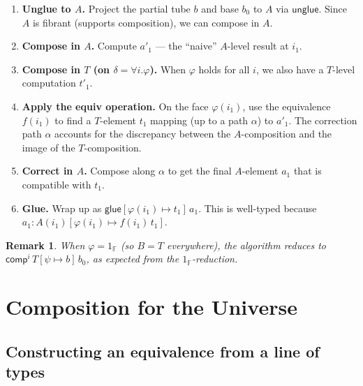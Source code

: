 \documentclass[11pt, a4paper]{article}
\newtheorem{remark}[theorem]{Remark}
\newcommand{\pt}[1]{\mathsf{#1}}
\newcommand{\glueT}{\pt{glue}}
\newcommand{\unglueT}{\pt{unglue}}
\newcommand{\compT}{\pt{comp}}
\newcommand{\sys}[2]{[#1 \mapsto #2]}
\newcommand{\ii}{i_1}
\newcommand{\topF}{1_{\mathbb{F}}}
\begin{document}
\begin{enumerate}[label=\textbf{Step \arabic*.}]
  \item \textbf{Unglue to $A$.} Project the partial tube $b$ and base $b_0$
        to $A$ via $\unglueT$. Since $A$ is fibrant (supports composition),
        we can compose in $A$.

  \item \textbf{Compose in $A$.} Compute $a'_1$ — the ``naive'' $A$-level
        result at $\ii$.

  \item \textbf{Compose in $T$ (on $\delta = \forall i.\varphi$).} When
        $\varphi$ holds for all $i$, we also have a $T$-level computation
        $t'_1$.

  \item \textbf{Apply the equiv operation.} On the face $\varphi(\ii)$, use
        the equivalence $f(\ii)$ to find a $T$-element $t_1$ mapping (up to a
        path $\alpha$) to $a'_1$. The correction path $\alpha$ accounts for
        the discrepancy between the $A$-composition and the image of the
        $T$-composition.

  \item \textbf{Correct in $A$.} Compose along $\alpha$ to get the final
        $A$-element $a_1$ that is compatible with $t_1$.

  \item \textbf{Glue.} Wrap up as $\glueT\sys{\varphi(\ii)}{t_1}\, a_1$.
        This is well-typed because $a_1 : A(\ii)\sys{\varphi(\ii)}{f(\ii)\,t_1}$.
\end{enumerate}

\begin{remark}
  When $\varphi = \topF$ (so $B = T$ everywhere), the algorithm reduces to
  $\compT^i\, T\sys{\psi}{b}\, b_0$, as expected from the $\topF$-reduction.
\end{remark}

\section{Composition for the Universe}

\subsection{Constructing an equivalence from a line of types}
\end{document}
